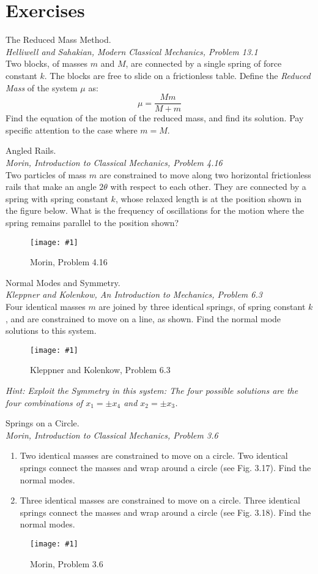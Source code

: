 \documentclass[11pt]{article}
\newcommand{\fig}[4]{
    \begin{figure}[H]
        \centering
        \texttt{[image: \#1]}
        \caption{#2}
        \label{exp4fit}
    \end{figure}
}
\theoremstyle{gangnamstyle}{\newtheorem{definition}{Definition}[]}
\theoremstyle{gangnamstyle}{\newtheorem{example}{Example}[]}
\theoremstyle{gangnamstyle}{\newtheorem{problem}{Problem}[]}
\theoremstyle{gangnamstyle}{\newtheorem{warning}{Warning}[]}
\begin{document}
\pagebreak

\section{Exercises}
\begin{problem}
The Reduced Mass Method. \\
\textit{Helliwell and Sahakian, Modern Classical Mechanics, Problem 13.1} \\
Two blocks, of masses $m$ and $M$, are connected by a single spring of force constant $k$. The blocks are free to slide on a frictionless table. Define the \textit{Reduced Mass} of the system $\mu$ as: 
\[ \mu = \frac{Mm}{M + m} \]
Find the equation of the motion of the reduced mass, and find its solution. Pay specific attention to the case where $m = M$. 
\end{problem}

\begin{problem}
Angled Rails. \\
\textit{Morin, Introduction to Classical Mechanics, Problem 4.16} \\
Two particles of mass $m$ are constrained to move along two horizontal frictionless rails that make an angle $2\theta$ with respect to each other. They are connected by a spring with spring constant $k$, whose relaxed length is at the position shown in the figure below. What is the frequency of oscillations for the motion where the spring remains parallel to the position
shown?
\fig{figs/n3/angled.jpg}{Morin, Problem 4.16}{0.5}{0}
\end{problem}

\pagebreak

\begin{problem}
Normal Modes and Symmetry. \\
\textit{Kleppner and Kolenkow, An Introduction to Mechanics, Problem 6.3} \\
Four identical masses $m$ are joined by three identical springs, of spring constant $k$, and are constrained to move on a line, as shown. Find the normal mode solutions to this system. 
\fig{figs/n3/kk.jpg}{Kleppner and Kolenkow, Problem 6.3}{0.5}{0}
\textit{Hint: Exploit the Symmetry in this system: The four possible solutions are the four combinations of $x_1 = \pm x_4$ and $x_2 = \pm x_3$. }
\end{problem}

\begin{problem}
Springs on a Circle. \\
\textit{Morin, Introduction to Classical Mechanics, Problem 3.6} \\
\begin{enumerate}
\item Two identical masses are constrained to move on a circle. Two identical springs connect the masses and wrap around a circle (see Fig. 3.17). Find the normal modes.
\item Three identical masses are constrained to move on a circle. Three identical springs connect the masses and wrap around a circle (see Fig. 3.18). Find the normal modes.
\end{enumerate}
\fig{figs/n3/morin.jpg}{Morin, Problem 3.6}{0.4}{0}
\end{problem}
\end{document}

